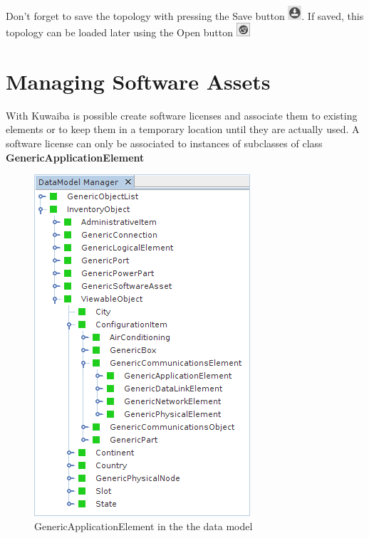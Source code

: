 \documentclass[a4paper]{article}
\begin{document}
		Don't forget to save the topology with pressing the Save button \includegraphics[width=0.5cm]{img/icon_save.png}. If saved, this topology can be loaded later using the Open button  \includegraphics[width=0.5cm]{img/icon_open.png}
	
	\newpage
    \section{Managing Software Assets} \label{sec:software_assets}
	    
	    With  Kuwaiba  is  possible create  software  licenses  and  associate  them  to  existing elements  or  to  keep  them  in  a  temporary  location  until  they  are  actually  used.  A  software license can only be associated to instances of subclasses of class \textbf{GenericApplicationElement}
	    \begin{figure}[h!]
	    	\centering
	    	\includegraphics[width=0.5\linewidth]{img/software_asset_generic_application_element.png}
	    	\caption{GenericApplicationElement in the the data model}
	    	\label{fig:software_asset_generic_application_element}
	    \end{figure}
	    
\end{document}
